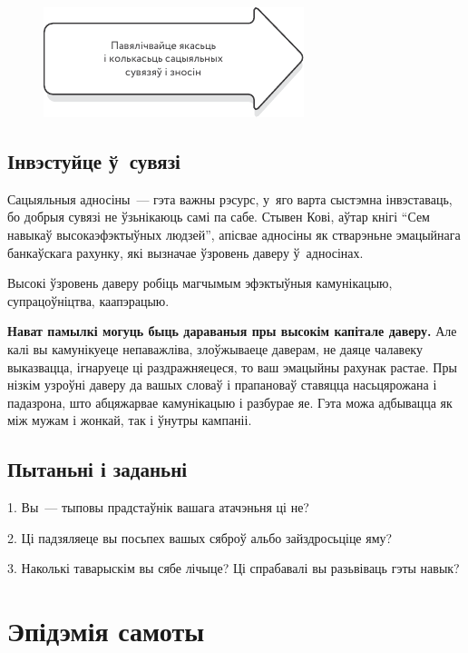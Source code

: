 \begin{figure}[htb!]
  \centering
  \includegraphics[scale=1.5]{willpower/ch10/3.pdf}
\end{figure}

\subsection*{Інвэстуйце ў~сувязі}

Сацыяльныя адносіны~--- гэта важны рэсурс, у~яго варта сыстэмна інвэставаць, бо добрыя сувязі не ўзьнікаюць самі па сабе. Стывен Кові, аўтар кнігі ``Сем навыкаў высокаэфэктыўных людзей'', апісвае адносіны як стварэньне эмацыйнага банкаўскага рахунку, які вызначае ўзровень даверу ў~адносінах.


Высокі ўзровень даверу робіць магчымым эфэктыўныя камунікацыю, супрацоўніцтва, каапэрацыю.

\textbf{Нават памылкі могуць быць дараваныя пры высокім капітале даверу.} Але калі вы камунікуеце непаважліва, злоўжываеце даверам, не даяце чалавеку выказвацца, ігнаруеце ці раздражняецеся, то ваш эмацыйны рахунак растае. Пры нізкім узроўні даверу да вашых словаў і прапановаў ставяцца насьцярожана і падазрона, што абцяжарвае камунікацыю і разбурае яе. Гэта можа адбывацца як між мужам і жонкай, так і ўнутры кампаніі.

\subsection*{Пытаньні і заданьні}

1. Вы~--- тыповы прадстаўнік вашага атачэньня ці не?

2. Ці падзяляеце вы посьпех вашых сяброў альбо зайздросьціце яму?

3. Наколькі таварыскім вы сябе лічыце? Ці спрабавалі вы разьвіваць гэты навык?


\section{Эпідэмія самоты}

